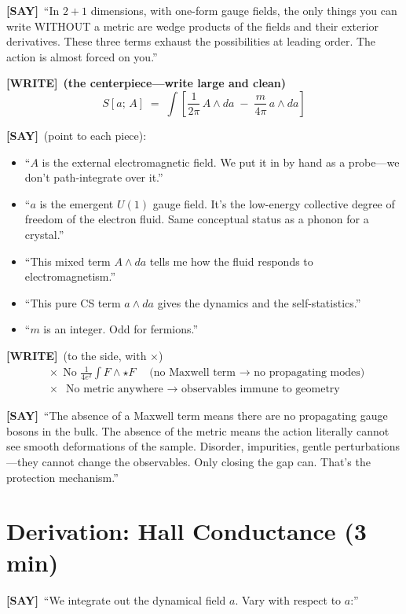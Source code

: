 \documentclass[11pt]{article}
\newcommand{\WRITE}{\textcolor{writecol}{\textbf{[WRITE]}}}
\newcommand{\SAY}{\textcolor{saycol}{\textbf{[SAY]}}}
\begin{document}
\SAY\ ``In $2{+}1$ dimensions, with one-form gauge fields, the only things you can write WITHOUT a metric are wedge products of the fields and their exterior derivatives. These three terms exhaust the possibilities at leading order. The action is almost forced on you.''

\WRITE\ {\large\bfseries (the centerpiece---write large and clean)}
\begin{equation*}
\boxed{S[a;\,A] \;=\; \int\!\left[\frac{1}{2\pi}\,A\wedge da \;-\; \frac{m}{4\pi}\,a\wedge da\right]}
\end{equation*}

\SAY\ (point to each piece):
\begin{itemize}[nosep]
\item ``$A$ is the external electromagnetic field. We put it in by hand as a probe---we don't path-integrate over it.''
\item ``$a$ is the emergent $U(1)$ gauge field. It's the low-energy collective degree of freedom of the electron fluid. Same conceptual status as a phonon for a crystal.''
\item ``This mixed term $A\wedge da$ tells me how the fluid responds to electromagnetism.''
\item ``This pure CS term $a\wedge da$ gives the dynamics and the self-statistics.''
\item ``$m$ is an integer. Odd for fermions.''
\end{itemize}

\WRITE\ (to the side, with $\boldsymbol\times$)
\begin{align*}
&\times\ \ \text{No } \tfrac{1}{4e^2}\!\int\! F\wedge\star F \quad\text{(no Maxwell term $\to$ no propagating modes)}\\
&\times\ \ \text{No metric anywhere $\to$ observables immune to geometry}
\end{align*}

\SAY\ ``The absence of a Maxwell term means there are no propagating gauge bosons in the bulk. The absence of the metric means the action literally cannot see smooth deformations of the sample. Disorder, impurities, gentle perturbations---they cannot change the observables. Only closing the gap can. That's the protection mechanism.''

\section{Derivation: Hall Conductance (3 min)}

\SAY\ ``We integrate out the dynamical field $a$. Vary with respect to $a$:''
\end{document}
